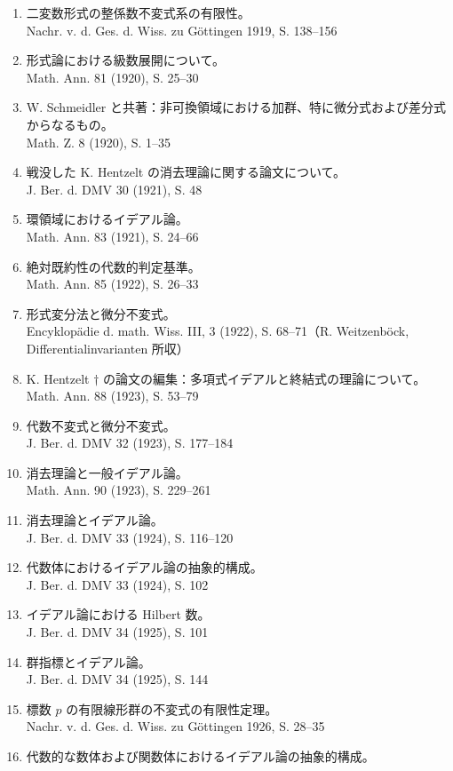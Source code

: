 \begin{enumerate}
J. Ber. d. DMV 28 (1919), S. 182--203
\item 二変数形式の整係数不変式系の有限性。\\
Nachr. v. d. Ges. d. Wiss. zu Göttingen 1919, S. 138--156
\item 形式論における級数展開について。\\
Math. Ann. 81 (1920), S. 25--30
\item W. Schmeidler と共著：非可換領域における加群、特に微分式および差分式からなるもの。\\
Math. Z. 8 (1920), S. 1--35
\item 戦没した K. Hentzelt の消去理論に関する論文について。\\
J. Ber. d. DMV 30 (1921), S. 48
\item 環領域におけるイデアル論。\\
Math. Ann. 83 (1921), S. 24--66
\item 絶対既約性の代数的判定基準。\\
Math. Ann. 85 (1922), S. 26--33
\item 形式変分法と微分不変式。\\
Encyklopädie d. math. Wiss. III, 3 (1922), S. 68--71（R. Weitzenböck, Differentialinvarianten 所収）
\item K. Hentzelt \(\dagger\) の論文の編集：多項式イデアルと終結式の理論について。\\
Math. Ann. 88 (1923), S. 53--79
\item 代数不変式と微分不変式。\\
J. Ber. d. DMV 32 (1923), S. 177--184
\item 消去理論と一般イデアル論。\\
Math. Ann. 90 (1923), S. 229--261
\item 消去理論とイデアル論。\\
J. Ber. d. DMV 33 (1924), S. 116--120
\item 代数体におけるイデアル論の抽象的構成。\\
J. Ber. d. DMV 33 (1924), S. 102
\item イデアル論における Hilbert 数。\\
J. Ber. d. DMV 34 (1925), S. 101
\item 群指標とイデアル論。\\
J. Ber. d. DMV 34 (1925), S. 144
\item 標数 \(p\) の有限線形群の不変式の有限性定理。\\
Nachr. v. d. Ges. d. Wiss. zu Göttingen 1926, S. 28--35
\item 代数的な数体および関数体におけるイデアル論の抽象的構成。\\

\end{enumerate}
